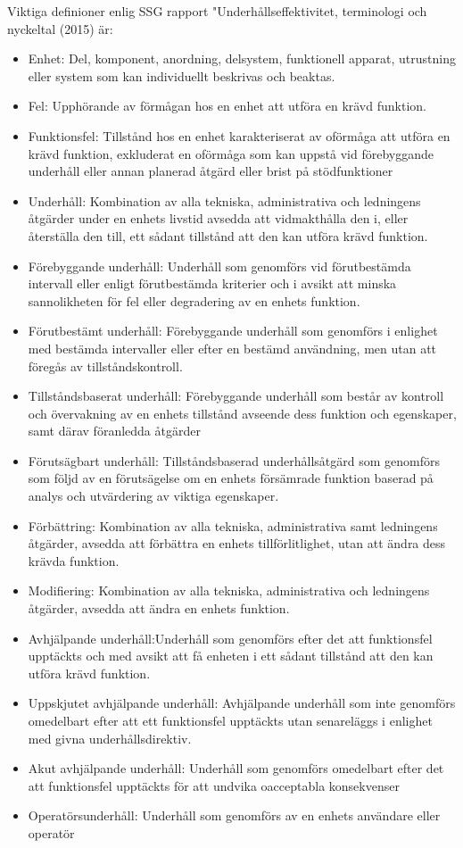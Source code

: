 	Viktiga definioner enlig SSG rapport "Underhållseffektivitet, terminologi och nyckeltal (2015) är:
\begin{itemize}	
  \item Enhet: Del, komponent, anordning, delsystem, funktionell apparat, utrustning eller system som kan individuellt beskrivas och beaktas. 
  \item Fel: Upphörande av förmågan hos en enhet att utföra en krävd funktion. 
  \item Funktionsfel: Tillstånd hos en enhet karakteriserat av oförmåga att utföra en krävd funktion, exkluderat en oförmåga som kan uppstå vid förebyggande underhåll eller annan planerad åtgärd eller brist på stödfunktioner
	\item Underhåll: Kombination av alla tekniska, administrativa och ledningens åtgärder under en enhets livstid avsedda att vidmakthålla den i, eller återställa den till, ett sådant tillstånd att den kan utföra krävd funktion.
  \item Förebyggande underhåll: Underhåll som genomförs vid förutbestämda intervall eller enligt förut\-bestämda kriterier och i avsikt att minska sannolikheten för fel eller degradering av en enhets funktion.
	\item Förutbestämt underhåll: Förebyggande underhåll som genomförs i enlighet med bestämda intervaller eller efter en bestämd användning, men utan att föregås av tillståndskontroll.
	\item Tillståndsbaserat underhåll: Förebyggande underhåll som består av kontroll och övervakning av en enhets tillstånd avseende dess funktion och egenskaper, samt därav föranledda åtgärder
	\item Förutsägbart underhåll: Tillståndsbaserad underhållsåtgärd som genomförs som följd av en förutsägelse om en enhets försämrade funktion baserad på analys och utvärdering av viktiga egenskaper.
	\item Förbättring: Kombination av alla tekniska, administrativa samt ledningens åtgärder, avsedda att förbättra en enhets tillförlitlighet, utan att ändra dess krävda funktion.
	\item Modifiering: Kombination av alla tekniska, administrativa och ledningens åtgärder, avsedda att ändra en enhets funktion.
	\item Avhjälpande underhåll:Underhåll som genomförs efter det att funktionsfel upptäckts och med avsikt att få enheten i ett sådant tillstånd att den kan utföra krävd funktion.
	\item Uppskjutet avhjälpande underhåll: Avhjälpande underhåll som inte genomförs omedelbart efter att ett funktionsfel upptäckts utan senareläggs i enlighet med givna underhållsdirektiv.
	\item Akut avhjälpande underhåll: Underhåll som genomförs omedelbart efter det att funktionsfel upptäckts för att undvika oacceptabla konsekvenser
	\item Operatörsunderhåll: Underhåll som genomförs av en enhets användare eller operatör
\end{itemize}	
	

